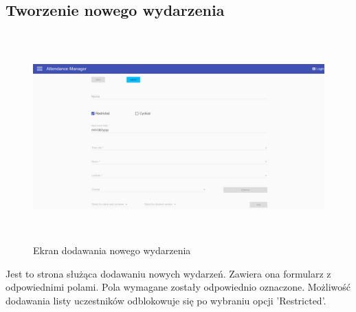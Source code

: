 \subsection{Tworzenie nowego wydarzenia}
\begin{figure}[h!]
\centering
\includegraphics[height=8cm,width=15cm]{images/AddNewEvent}
\caption{Ekran dodawania nowego wydarzenia}
\label{fig:AddnewEvent}
\end{figure}
Jest to strona służąca dodawaniu nowych wydarzeń. Zawiera ona formularz z odpowiednimi polami. Pola wymagane zostały odpowiednio oznaczone. Możliwość dodawania listy uczestników odblokowuje się po wybraniu opcji 'Restricted'.